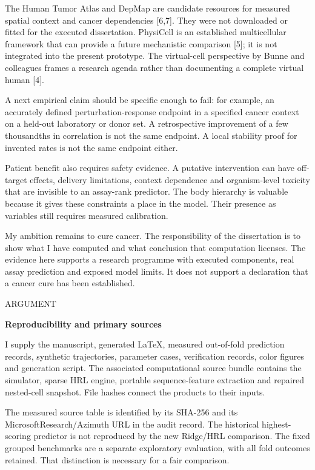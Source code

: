 \documentclass[10pt]{article}
\begin{document}
The Human Tumor Atlas and DepMap are candidate resources for measured spatial context and cancer dependencies [6,7]. They were not downloaded or fitted for the executed dissertation. PhysiCell is an established multicellular framework that can provide a future mechanistic comparison [5]; it is not integrated into the present prototype. The virtual-cell perspective by Bunne and colleagues frames a research agenda rather than documenting a complete virtual human [4].\par
A next empirical claim should be specific enough to fail: for example, an accurately defined perturbation-response endpoint in a specified cancer context on a held-out laboratory or donor set. A retrospective improvement of a few thousandths in correlation is not the same endpoint. A local stability proof for invented rates is not the same endpoint either.\par
Patient benefit also requires safety evidence. A putative intervention can have off-target effects, delivery limitations, context dependence and organism-level toxicity that are invisible to an assay-rank predictor. The body hierarchy is valuable because it gives these constraints a place in the model. Their presence as variables still requires measured calibration.\par
My ambition remains to cure cancer. The responsibility of the dissertation is to show what I have computed and what conclusion that computation licenses. The evidence here supports a research programme with executed components, real assay prediction and exposed model limits. It does not support a declaration that a cancer cure has been established.\par
\clearpage
\hypertarget{p19}{}
{\small\color{accent}\MakeUppercase{Argument}}\par
{\LARGE\bfseries\color{ink}Reproducibility and primary sources}\par\vspace{5pt}
I supply the manuscript, generated LaTeX, measured out-of-fold prediction records, synthetic trajectories, parameter cases, verification records, color figures and generation script. The associated computational source bundle contains the simulator, sparse HRL engine, portable sequence-feature extraction and repaired nested-cell snapshot. File hashes connect the products to their inputs.\par
The measured source table is identified by its SHA-256 and its MicrosoftResearch/Azimuth URL in the audit record. The historical highest-scoring predictor is not reproduced by the new Ridge/HRL comparison. The fixed grouped benchmarks are a separate exploratory evaluation, with all fold outcomes retained. That distinction is necessary for a fair comparison.\par
\end{document}
